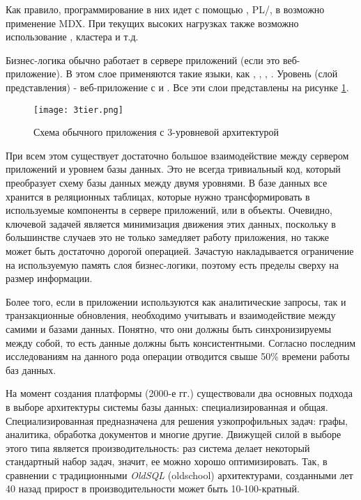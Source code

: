 Как правило, программирование в них идет с помощью \sql, PL/\sql, в \olap возможно применение MDX. При текущих высоких нагрузках также возможно использование \nosql, \hadoop кластера и т.д.

Бизнес-логика обычно работает в сервере приложений (если это веб-приложение). В этом слое применяются такие языки, как \java, \csharp, \python, \scala.
Уровень \ui (слой представления) - веб-приложение с \html и \js. Все эти слои представлены на рисунке \ref{fig:technology:logicblox:three_tier_architecture}.

\begin{figure}
	\centering
	\texttt{[image: 3tier.png]}
	\caption{Схема обычного приложения с 3-уровневой архитектурой}
	\label{fig:technology:logicblox:three_tier_architecture}
\end{figure}

При всем этом существует достаточно большое взаимодействие между сервером приложений и уровнем базы данных. Это не всегда тривиальный код, который преобразует схему базы данных между двумя уровнями. В базе данных все хранится в реляционных таблицах, которые нужно трансформировать в используемые компоненты в сервере приложений, или в объекты. Очевидно, ключевой задачей является минимизация движения этих данных, поскольку в большинстве случаев это не только замедляет работу приложения, но также может быть достаточно дорогой операцией. Зачастую накладывается ограничение на используемую память слоя бизнес-логики, поэтому есть пределы сверху на размер информации.

Более того, если в приложении используются как аналитические запросы, так и транзакционные обновления, необходимо учитывать и взаимодействие между самими \olap и \oltp базами данных. Понятно, что они должны быть синхронизируемы между собой, то есть данные должны быть консистентными. Согласно последним исследованиям на данного рода операции отводится свыше 50\% времени работы баз данных.

На момент создания платформы (2000-е гг.) существовали два основных подхода в выборе архитектуры системы базы данных: специализированная и общая. Специализированная предназначена для решения узкопрофильных задач: графы, аналитика, обработка документов и многие другие. Движущей силой в выборе этого типа является производительность: раз система делает некоторый стандартный набор задач, значит, ее можно хорошо оптимизировать. Так, в сравнении с традиционными \emph{OldSQL} (oldschool) архитектурами, созданными лет 40 назад прирост в производительности может быть 10-100-кратный.

